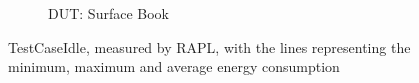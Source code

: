 \begin{figure}[H]
\begin{subfigure}[b]{0.49\linewidth}
\caption{DUT: Surface Book}\label{fig:time_series_TestCaseIdle_RAPL_SB}
\end{subfigure}
\caption{TestCaseIdle, measured by RAPL, with the lines representing the minimum, maximum and average energy consumption}\label{fig:time_series_TestCaseIdle_RAPL}
\end{figure}
